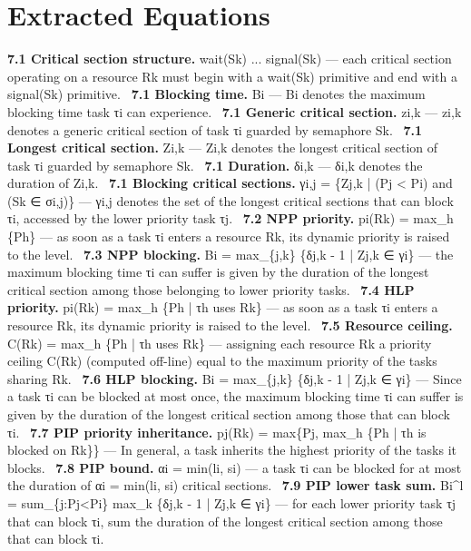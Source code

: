 \documentclass[conference]{IEEEtran}
\begin{document}
\section{Extracted Equations}
\textbf{7.1 Critical section structure.} wait(Sk) ... signal(Sk) --- each critical section operating on a resource Rk must begin with a wait(Sk) primitive and end with a signal(Sk) primitive. \cite{Buttazzo2011}\
\textbf{7.1 Blocking time.} Bi --- Bi denotes the maximum blocking time task τi can experience. \cite{Buttazzo2011}\
\textbf{7.1 Generic critical section.} zi,k --- zi,k denotes a generic critical section of task τi guarded by semaphore Sk. \cite{Buttazzo2011}\
\textbf{7.1 Longest critical section.} Zi,k --- Zi,k denotes the longest critical section of task τi guarded by semaphore Sk. \cite{Buttazzo2011}\
\textbf{7.1 Duration.} δi,k --- δi,k denotes the duration of Zi,k. \cite{Buttazzo2011}\
\textbf{7.1 Blocking critical sections.} γi,j = \{Zj,k | (Pj < Pi) and (Sk ∈ σi,j)\} --- γi,j denotes the set of the longest critical sections that can block τi, accessed by the lower priority task τj. \cite{Buttazzo2011}\
\textbf{7.2 NPP priority.} pi(Rk) = max\_h \{Ph\} --- as soon as a task τi enters a resource Rk, its dynamic priority is raised to the level. \cite{Buttazzo2011}\
\textbf{7.3 NPP blocking.} Bi = max\_\{j,k\} \{δj,k - 1 | Zj,k ∈ γi\} --- the maximum blocking time τi can suffer is given by the duration of the longest critical section among those belonging to lower priority tasks. \cite{Buttazzo2011}\
\textbf{7.4 HLP priority.} pi(Rk) = max\_h \{Ph | τh uses Rk\} --- as soon as a task τi enters a resource Rk, its dynamic priority is raised to the level. \cite{Buttazzo2011}\
\textbf{7.5 Resource ceiling.} C(Rk) = max\_h \{Ph | τh uses Rk\} --- assigning each resource Rk a priority ceiling C(Rk) (computed off-line) equal to the maximum priority of the tasks sharing Rk. \cite{Buttazzo2011}\
\textbf{7.6 HLP blocking.} Bi = max\_\{j,k\} \{δj,k - 1 | Zj,k ∈ γi\} --- Since a task τi can be blocked at most once, the maximum blocking time τi can suffer is given by the duration of the longest critical section among those that can block τi. \cite{Buttazzo2011}\
\textbf{7.7 PIP priority inheritance.} pj(Rk) = max\{Pj, max\_h \{Ph | τh is blocked on Rk\}\} --- In general, a task inherits the highest priority of the tasks it blocks. \cite{Buttazzo2011}\
\textbf{7.8 PIP bound.} αi = min(li, si) --- a task τi can be blocked for at most the duration of αi = min(li, si) critical sections. \cite{Buttazzo2011}\
\textbf{7.9 PIP lower task sum.} Bi\textasciicircum{}l = sum\_\{j:Pj<Pi\} max\_k \{δj,k - 1 | Zj,k ∈ γi\} --- for each lower priority task τj that can block τi, sum the duration of the longest critical section among those that can block τi. \cite{Buttazzo2011}\
\end{document}
